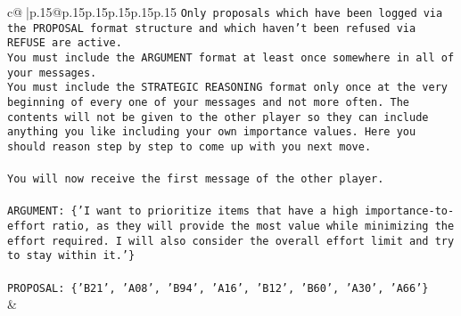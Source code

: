 \documentclass{article}
\begin{document}
{\begin{supertabular}{c@{$\;$}|p{.15\linewidth}@{}p{.15\linewidth}p{.15\linewidth}p{.15\linewidth}p{.15\linewidth}p{.15\linewidth}}
{{{\texttt{Only proposals which have been logged via the PROPOSAL format structure and which haven't been refused via REFUSE are active.} \\
\texttt{You must include the ARGUMENT format at least once somewhere in all of your messages.} \\
\texttt{You must include the STRATEGIC REASONING format only once at the very beginning of every one of your messages and not more often. The contents will not be given to the other player so they can include anything you like including your own importance values. Here you should reason step by step to come up with you next move.} \\
\\ 
\texttt{You will now receive the first message of the other player.} \\
\\ 
\texttt{ARGUMENT: \{'I want to prioritize items that have a high importance{-}to{-}effort ratio, as they will provide the most value while minimizing the effort required. I will also consider the overall effort limit and try to stay within it.'\}} \\
\\ 
\texttt{PROPOSAL: \{'B21', 'A08', 'B94', 'A16', 'B12', 'B60', 'A30', 'A66'\}} \\
            }
        }
    }
    & \\ \\


\end{supertabular}}
\end{document}
